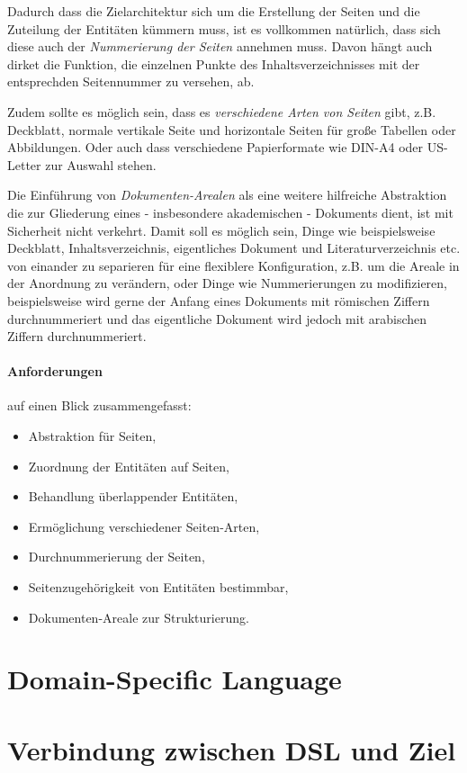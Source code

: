 Dadurch dass die Zielarchitektur sich um die Erstellung der Seiten und
die Zuteilung der Entitäten kümmern muss, ist es vollkommen natürlich,
dass sich diese auch der \emph{Nummerierung der Seiten} annehmen muss.
Davon hängt auch dirket die Funktion, die einzelnen Punkte des
Inhaltsverzeichnisses mit der entsprechden Seitennummer zu versehen, ab.

Zudem sollte es möglich sein, dass es \emph{verschiedene Arten von Seiten}
gibt, z.B. Deckblatt, normale vertikale Seite und horizontale Seiten für
große Tabellen oder Abbildungen. Oder auch dass verschiedene Papierformate
wie DIN-A4 oder US-Letter zur Auswahl stehen.

Die Einführung von \emph{Dokumenten-Arealen} als eine weitere hilfreiche
Abstraktion die zur Gliederung eines - insbesondere
akademischen - Dokuments dient, ist mit Sicherheit nicht verkehrt.
Damit soll es möglich sein, Dinge wie beispielsweise
Deckblatt, Inhaltsverzeichnis, eigentliches Dokument
und Literaturverzeichnis etc. von einander zu separieren für eine
flexiblere Konfiguration, z.B. um die Areale in der Anordnung zu
verändern, oder Dinge wie Nummerierungen zu modifizieren, beispielsweise
wird gerne der Anfang eines Dokuments mit römischen Ziffern durchnummeriert
und das eigentliche Dokument wird jedoch mit
arabischen Ziffern durchnummeriert.


\paragraph{Anforderungen} auf einen Blick zusammengefasst:

\begin{itemize}
  \item Abstraktion für Seiten,
  \item Zuordnung der Entitäten auf Seiten,
  \item Behandlung überlappender Entitäten,
  \item Ermöglichung verschiedener Seiten-Arten,
  \item Durchnummerierung der Seiten,
  \item Seitenzugehörigkeit von Entitäten bestimmbar,
  \item Dokumenten-Areale zur Strukturierung.
\end{itemize}


\section{Domain-Specific Language}\label{sec-dsl}


\section{Verbindung zwischen DSL und Ziel}\label{sec-verbindung}


